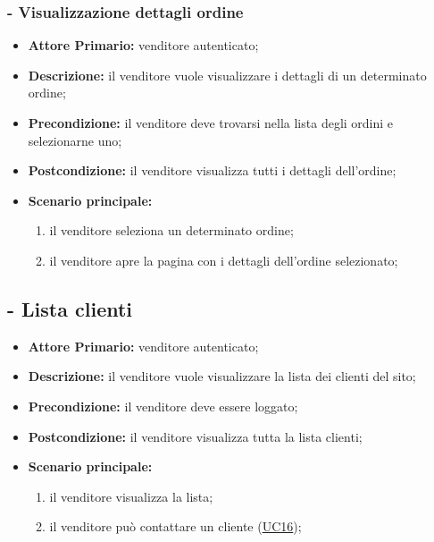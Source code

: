 \subsubsection{- Visualizzazione dettagli ordine}
\begin{itemize}
    \item \textbf{Attore Primario:} venditore autenticato;
    \item \textbf{Descrizione:} il venditore vuole visualizzare i dettagli di un determinato ordine;
    \item \textbf{Precondizione:} il venditore deve trovarsi nella lista degli ordini e selezionarne uno;
    \item \textbf{Postcondizione:} il venditore visualizza tutti i dettagli dell'ordine;
    \item \textbf{Scenario principale:}
    \begin{enumerate}
        \item il venditore seleziona un determinato ordine;
        \item il venditore apre la pagina con i dettagli dell'ordine selezionato;
    \end{enumerate}
\end{itemize}

\stepUserCase
\subsection{ - Lista clienti}
\begin{itemize}
    \item \textbf{Attore Primario:} venditore autenticato;
    \item \textbf{Descrizione:} il venditore vuole visualizzare la lista dei clienti del sito;
    \item \textbf{Precondizione:} il venditore deve essere loggato;
    \item \textbf{Postcondizione:} il venditore visualizza tutta la lista clienti;
    \item \textbf{Scenario principale:}
    \begin{enumerate}
        \item il venditore visualizza la lista;
         \item il venditore può contattare un cliente (\hyperref[UC16]{UC16});
    \end{enumerate}
\end{itemize}

\stepUserCase
